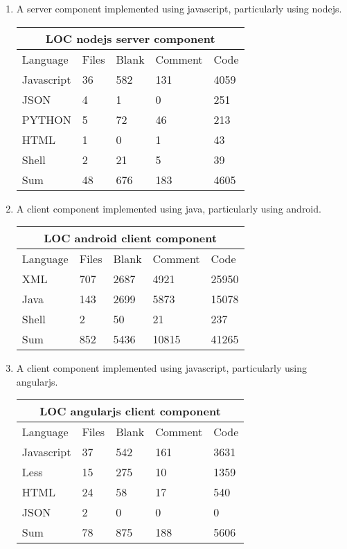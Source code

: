 \documentclass[english,12pt,a4paper,pdftex,sci,utf8]{aaltothesis}
\begin{document}
\begin{enumerate}[label=\textbf{C\arabic*}]
\item A server component implemented using javascript, particularly using nodejs.

\begin{tabular}{ |p{3cm}||p{2cm}|p{2cm}|p{2cm}|p{2cm}|  }
 \hline
 \multicolumn{5}{|c|}{LOC nodejs server component} \\
 \hline
 Language       &Files  &Blank  &Comment    &Code\\
 \hline
 Javascript     &36     &582    &131        &4059\\
 JSON           &4      &1      &0          &251\\
 PYTHON         &5      &72     &46         &213\\
 HTML           &1      &0      &1          &43\\
 Shell   &2      &21     &5          &39\\
 \hline
 Sum            &48     &676    &183        &4605\\
 \hline
\end{tabular}

\item A client component implemented using java, particularly using android.

\begin{tabular}{ |p{3cm}||p{2cm}|p{2cm}|p{2cm}|p{2cm}|  }
 \hline
 \multicolumn{5}{|c|}{LOC android client component} \\
 \hline
 Language       &Files  &Blank  &Comment    &Code\\
 \hline
 XML            &707    &2687   &4921       &25950\\
 Java           &143    &2699   &5873       &15078\\
 Shell          &2      &50     &21         &237\\
 \hline
 Sum            &852    &5436   &10815      &41265\\
 \hline
\end{tabular}
\item A client component implemented using javascript, particularly using angularjs.

\begin{tabular}{ |p{3cm}||p{2cm}|p{2cm}|p{2cm}|p{2cm}|  }
 \hline
 \multicolumn{5}{|c|}{LOC angularjs client component} \\
 \hline
 Language&Files&Blank&Comment&Code\\
 \hline
 Javascript   & 37    &542&   161&3631\\
 Less&   15  & 275   &10 & 1359\\
 HTML &24 & 58&  17&540\\
 JSON    &2 & 0&  0 & 0\\
 \hline
 Sum&78&875&188&5606\\
 \hline
\end{tabular}
\end{enumerate}
\end{document}
